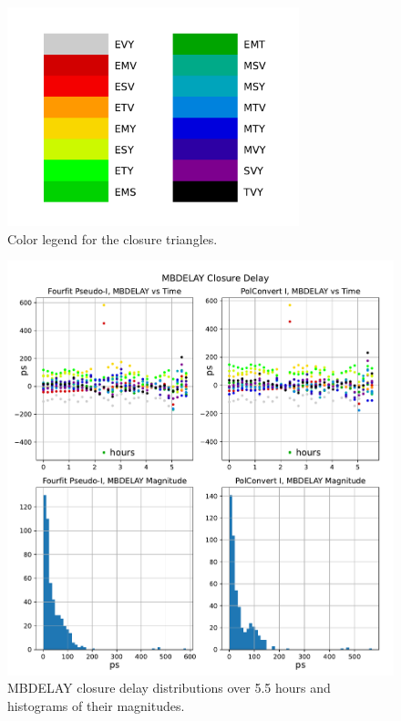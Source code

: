 \documentclass[letterpaper,twoside,12pt]{article}
\begin{document}
\begin{figure}[h!]
  \centering
  \includegraphics[width=20pc]{Triangle_color_legend.pdf}
  \caption{\small Color legend for the closure triangles.}
  \label{col_legend}
\end{figure}


\begin{figure}[h!]
  \centering
  \includegraphics[width=35pc]{MBDELAY_Closure_Delay.pdf}
  \caption{\small MBDELAY closure delay distributions over 5.5 hours and histograms of their magnitudes.}
  \label{mbd}
\end{figure}
\end{document}

